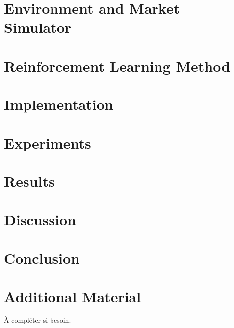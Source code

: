 \documentclass[11pt,a4paper,oneside]{report}
\begin{document}
\chapter{Environment and Market Simulator}


\chapter{Reinforcement Learning Method}


\chapter{Implementation}


\chapter{Experiments}


\chapter{Results}


\chapter{Discussion}


\chapter{Conclusion}


\appendix
\chapter{Additional Material}
À compléter si besoin.

\clearpage


\end{document}
